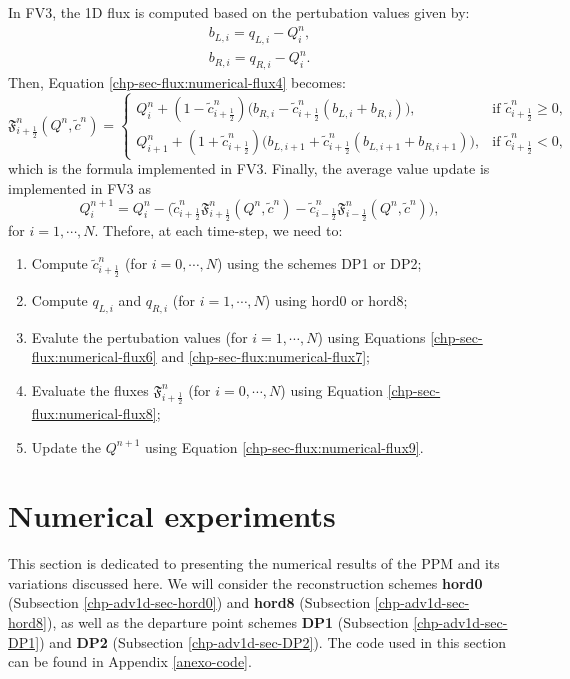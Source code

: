 In FV3, the 1D flux is computed based on the pertubation values \citep{harris:2021} given by:
\begin{align}
\label{chp-sec-flux:numerical-flux6}
b_{L,i} = q_{L,i} - Q_i^n, \\
\label{chp-sec-flux:numerical-flux7}
b_{R,i} = q_{R,i} - Q_i^n.
\end{align}
Then, Equation \eqref{chp-sec-flux:numerical-flux4} becomes:
\begin{equation}
	\label{chp-sec-flux:numerical-flux8}
        \mathfrak{F}_{i+\frac{1}{2}}^n(Q^n,\tilde{c}^n)  =  
    	\begin{cases}
        Q_{i}^n +
        (1-\tilde{c}_{{i+\frac{1}{2}}}^n)
        \big(b_{R,i}-\tilde{c}_{{i+\frac{1}{2}}}^n
        (b_{L,i}+b_{R,i})\big),
	& \text{if } \tilde{c}_{i+\frac{1}{2}}^n \geq 0,\\
	Q_{i+1}^n +
        (1+\tilde{c}_{{i+\frac{1}{2}}}^n)
        \big(b_{L,i+1}+\tilde{c}_{{i+\frac{1}{2}}}^n
        (b_{L,i+1}+b_{R,i+1})\big),
	& \text{if } \tilde{c}_{i+\frac{1}{2}}^n<0,
    	\end{cases}
\end{equation}
which is the formula implemented in FV3.
Finally, the average value update is implemented in FV3 as
\begin{equation}
	\label{chp-sec-flux:numerical-flux9}
	Q_i^{n+1} = Q_i^{n} - 
        \big(\tilde{c}_{i+\frac{1}{2}}^n\mathfrak{F}_{i+\frac{1}{2}}^n(Q^n,\tilde{c}^n) -
        \tilde{c}_{i-\frac{1}{2}}^n\mathfrak{F}_{i-\frac{1}{2}}^n(Q^n,\tilde{c}^n)  \big),
\end{equation}
for $i=1, \cdots, N$.
Thefore, at each time-step, we need to:
\begin{enumerate}
\item Compute $\tilde{c}_{i+\frac{1}{2}}^n$ (for $i = 0, \cdots, N$) using the schemes DP1 or DP2;
\item Compute $q_{L,i}$ and  $q_{R,i}$ (for $i = 1, \cdots, N$) using hord0 or hord8;
\item Evalute the pertubation values (for $i = 1, \cdots, N$) using Equations
\eqref{chp-sec-flux:numerical-flux6} and \eqref{chp-sec-flux:numerical-flux7};
\item Evaluate the fluxes  $\mathfrak{F}_{i+\frac{1}{2}}^n$ (for $i = 0, \cdots, N$) using Equation \eqref{chp-sec-flux:numerical-flux8};
\item Update the $Q^{n+1}$ using Equation \eqref{chp-sec-flux:numerical-flux9}.
\end{enumerate}
\section{Numerical experiments}
\label{chp-adv1d-sec-numerical-exp}
This section is dedicated to presenting the numerical results of the PPM and 
its variations discussed here. We will consider the reconstruction
schemes \textbf{hord0} (Subsection \ref{chp-adv1d-sec-hord0}) and 
\textbf{hord8} (Subsection \ref{chp-adv1d-sec-hord8}), as well as the departure point schemes
\textbf{DP1} (Subsection \ref{chp-adv1d-sec-DP1}) and \textbf{DP2} (Subsection \ref{chp-adv1d-sec-DP2}).
The code used in this section can be found in Appendix \ref{anexo-code}.


